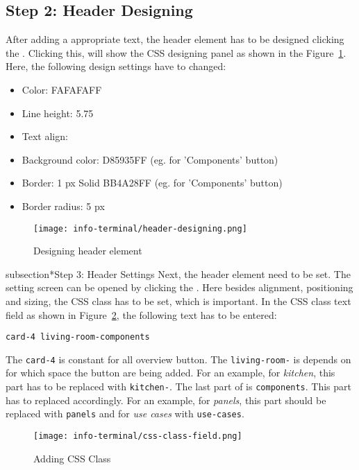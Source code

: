 \subsection*{Step 2: Header Designing}
After adding a appropriate text, the header element has to be designed clicking the . Clicking this, will show the CSS designing panel as shown in the Figure~\ref{fig:header-designing}. Here, the following design settings have to changed:
\begin{itemize}
\item Color: FAFAFAFF
\item Line height: 5.75
\item Text align: 
\item Background color: D85935FF (eg. for 'Components' button)
\item Border: 1 px Solid BB4A28FF (eg. for 'Components' button)
\item Border radius: 5 px
\end{itemize}

\begin{figure}[ht]
\caption{Designing header element}
\label{fig:header-designing}
\centering
\texttt{[image: info-terminal/header-designing.png]}
\end{figure}

subsection*{Step 3: Header Settings}
Next, the header element need to be set. The setting screen can be opened by clicking the . Here besides alignment, positioning and sizing, the CSS class has to be set, which is important. In the CSS class text field as shown in Figure~\ref{fig:css-class-field}, the following text has to be entered:
\begin{lstlisting}
card-4 living-room-components
\end{lstlisting}

The \texttt{card-4} is constant for all overview button. The \texttt{living-room-} is depends on for which space the button are being added. For an example, for \emph{kitchen}, this part has to be replaced with \texttt{kitchen-}. The last part of is \texttt{components}. This part has to replaced accordingly. For an example, for \emph{panels}, this part should be replaced with \texttt{panels} and for \emph{use cases} with \texttt{use-cases}.

\begin{figure}[ht]
\caption{Adding CSS Class}
\label{fig:css-class-field}
\centering
\texttt{[image: info-terminal/css-class-field.png]}
\end{figure}

